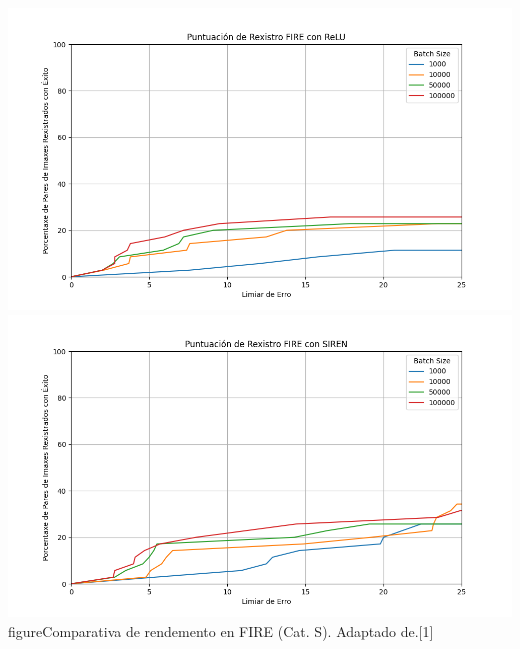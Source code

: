 \documentclass[xcolor=dvipsnames]{beamer}
\begin{document}
\begin{frame}
\begin{columns}
        \begin{column}{0.5\textwidth}
            \centering
        \includegraphics[width=\textwidth]{../imaxes/batchsize/fire_registration_scores_bs_relu_S.png}
                \includegraphics[width=\textwidth]{../imaxes/batchsize/fire_registration_scores_bs_siren_S.png}    
        \small{figure}{Comparativa de rendemento en FIRE (Cat. S). Adaptado de.[1]}
        \end{column}
    \end{columns}
    

\end{frame}
\end{document}
